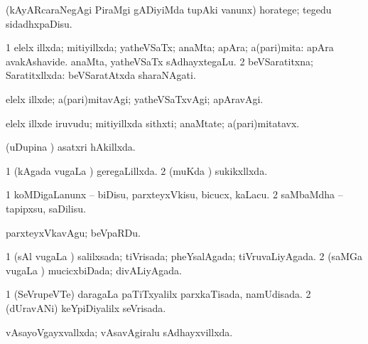 {{\bentry
{} 
\gl{\akirx}
\expl{}
\bmng
(kAyARcaraNegAgi PiraMgi gADiyiMda tupAki \mo vanunx) horatege; tegedu sidadhxpaDisu. 
\emng
\eentry

\bentry
{} 
\gl{\gu}
\expl{}
\bmng
\bnum
\num{1} elelx illxda; mitiyillxda; yatheVSaTx; anaMta; apAra; a(pari)mita:  apAra avakAshavide.  anaMta, yatheVSaTx sAdhayxtegaLu. 
\num{2} beVSaratitxna; Saratitxllxda:  beVSaratAtxda sharaNAgati. 
\enum
\emng
\eentry

\bentry
{} 
\gl{\kirxvi}
\expl{}
\bmng
elelx illxde; a(pari)mitavAgi; yatheVSaTxvAgi; apAravAgi. 
\emng
\eentry

\bentry
{} 
\gl{\nA}
\expl{}
\bmng
elelx illxde iruvudu; mitiyillxda sithxti; anaMtate; a(pari)mitatavx. 
\emng
\eentry

\bentry
{} 
\gl{\gu}
\expl{}
\bmng
(uDupina \vi) asatxri hAkillxda. 
\emng
\eentry

\bentry
{} 
\gl{\gu}
\expl{}
\bmng
\bnum
\num{1} (kAgada \mo vugaLa \vi) geregaLillxda. 
\num{2} (muKda \vi) sukikxllxda. 
\enum
\emng
\eentry

\bentry
{} 
\gl{\sakirx}
\expl{}
\bmng
\bnum
\num{1} koMDigaLanunx -- biDisu, parxteyxVkisu, bicucx, kaLacu. 
\num{2} saMbaMdha -- tapipxsu, saDilisu. 
\enum
\emng

\noindent 
\gl{\akirx}
\expl{}
\bmng
parxteyxVkavAgu; beVpaRDu. 
\emng
\eentry

\bentry
{} 
\gl{\gu}
\expl{}
\bmng
\bnum
\num{1} (sAl \mo vugaLa \vi) salilxsada; tiVrisada; pheYsalAgada; tiVruvaLiyAgada. 
\num{2} (saMGa \mo vugaLa \vi) mucicxbiDada; divALiyAgada. 
\enum
\emng
\eentry

\bentry
{} 
\gl{\gu}
\bmng
\bnum
\num{1} (SeVrupeVTe) daragaLa paTiTxyalilx parxkaTisada, namUdisada. 
\num{2} (dUravANi) keYpiDiyalilx seVrisada. 
\enum
\emng
\eentry

\bentry
{} 
\gl{\gu}
\bmng
{} 
\emng
\eentry

\bentry
{} 
\gl{\gu}
\expl{}
\bmng
vAsayoVgayxvallxda; vAsavAgiralu sAdhayxvillxda. 
\emng
\eentry

}}
